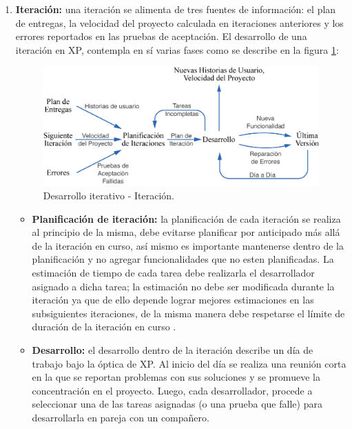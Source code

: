 \begin{enumerate}
	\item \textbf{Iteración:} una iteración se alimenta de tres fuentes de información: el plan de entregas, la velocidad del proyecto calculada en iteraciones anteriores y los errores reportados en las pruebas de aceptación. El desarrollo de una iteración en XP, contempla en sí varias fases como se describe en la figura \ref{fig:xp_iteration}:
	\begin{figure}[ht]
		\centering
		\includegraphics{imagenes/XP-Iteracion.png}
		\caption{Desarrollo iterativo - Iteración. \citep{Metodologia_XP_grafico_it_2006}}
		\label{fig:xp_iteration}
	\end{figure}

	\begin{itemize}
		\item \textbf{Planificación de iteración:} la planificación de cada iteración se realiza al principio de la misma, debe evitarse planificar por anticipado más allá de la iteración en curso, así mismo es importante mantenerse dentro de la planificación y no agregar funcionalidades que no esten planificadas. La estimación de tiempo de cada tarea debe realizarla el desarrollador asignado a dicha tarea; la estimación no debe ser modificada durante la iteración ya que de ello depende lograr mejores estimaciones en las subsiguientes iteraciones, de la misma manera debe respetarse el límite de duración de la iteración en curso \citep{Metodologia_XP_iterativo2006}.
		
		\item \textbf{Desarrollo:} el desarrollo dentro de la iteración describe un día de trabajo bajo la óptica de XP. Al inicio del día se realiza una reunión corta \citep{Metodologia_XP_standup2006} en la que se reportan problemas con sus soluciones y se promueve la concentración en el proyecto. Luego, cada desarrollador, procede a seleccionar una de las tareas asignadas (o una prueba que falle) para desarrollarla en pareja con un compañero. \\
		

\end{itemize}
\end{enumerate}

